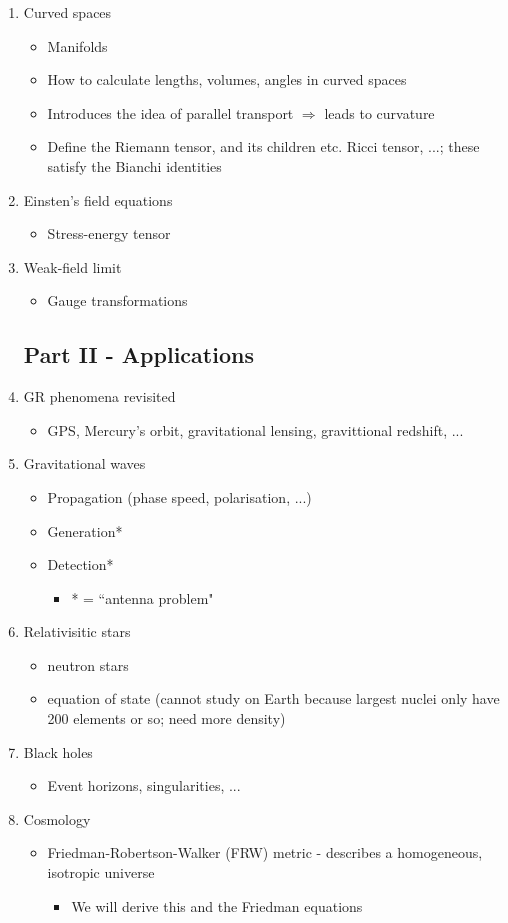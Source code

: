 \documentclass[a4paper]{article} %
\begin{document}
\begin{enumerate}
\item Curved spaces
\begin{itemize}
\item Manifolds 
\item How to calculate lengths, volumes, angles in curved spaces
\item Introduces the idea of parallel transport $\Rightarrow$ leads to curvature
\item Define the Riemann tensor, and its children etc. Ricci tensor, ...; these satisfy the Bianchi identities
\end{itemize}
\item Einsten's field equations
\begin{itemize}
\item Stress-energy tensor
\end{itemize}
\item Weak-field limit
\begin{itemize}
\item Gauge transformations
\end{itemize}
\subsection{Part II - Applications}
\item GR phenomena revisited 
\begin{itemize}
\item GPS, Mercury's orbit, gravitational lensing, gravittional redshift, ...
\end{itemize}
\item Gravitational waves
\begin{itemize}
\item Propagation (phase speed, polarisation, ...)
\item Generation*
\item Detection*
\begin{itemize}
\item * = ``antenna problem"
\end{itemize}
\end{itemize}
\item Relativisitic stars
\begin{itemize}
\item neutron stars
\item equation of state (cannot study on Earth because largest nuclei only have 200 elements or so; need more density)
\end{itemize}
\item Black holes
\begin{itemize}
\item Event horizons, singularities, ...
\end{itemize}
\item Cosmology
\begin{itemize}
\item Friedman-Robertson-Walker (FRW) metric - describes a homogeneous, isotropic universe
\begin{itemize}
\item We will derive this and the Friedman equations
\end{itemize}
\end{itemize}


\end{enumerate}
\end{document}
